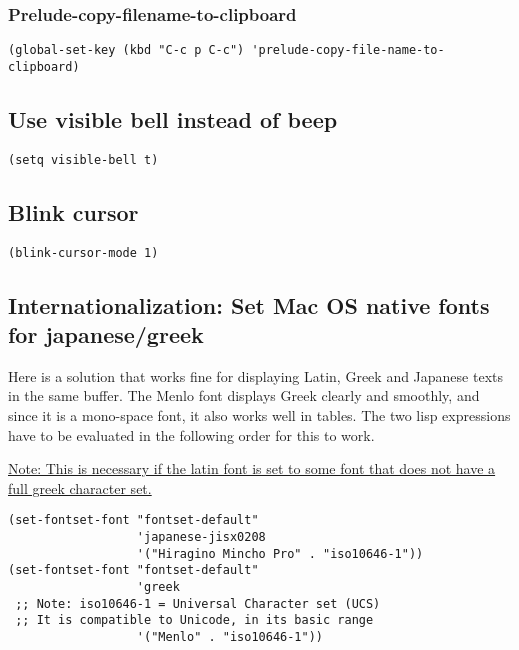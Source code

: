 \documentclass{article}
\begin{document}
\subsubsection{Prelude-copy-filename-to-clipboard}
\label{sec-1-3-2}

\begin{verbatim}
(global-set-key (kbd "C-c p C-c") 'prelude-copy-file-name-to-clipboard)
\end{verbatim}

\subsection{Use visible bell instead of beep}
\label{sec-1-4}

\begin{verbatim}
(setq visible-bell t)
\end{verbatim}


\subsection{Blink cursor}
\label{sec-1-5}

\begin{verbatim}
(blink-cursor-mode 1)
\end{verbatim}

\subsection{Internationalization: Set Mac OS native fonts for japanese/greek}
\label{sec-1-6}

Here is a solution that works fine for displaying Latin, Greek and Japanese texts in the same buffer.  The Menlo font displays Greek clearly and smoothly, and since it is a mono-space font, it also works well in tables.  The two lisp expressions have to be evaluated in the following order for this to work.

\uline{Note: This is necessary if the latin font is set to some font that does not have a full greek character set.}

\begin{verbatim}
(set-fontset-font "fontset-default"
                  'japanese-jisx0208
                  '("Hiragino Mincho Pro" . "iso10646-1"))
(set-fontset-font "fontset-default"
                  'greek
 ;; Note: iso10646-1 = Universal Character set (UCS)
 ;; It is compatible to Unicode, in its basic range
                  '("Menlo" . "iso10646-1"))
\end{verbatim}
\end{document}
